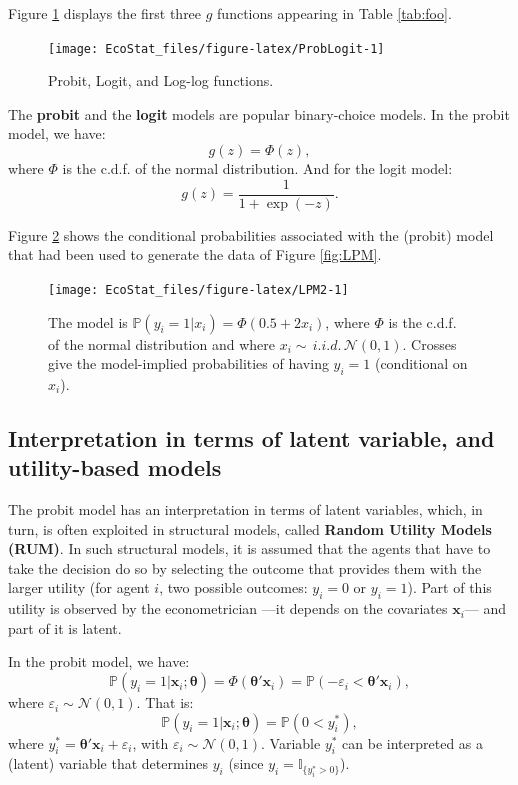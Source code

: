 \documentclass[
  12pt,
]{book}
\theoremstyle{definition}
\theoremstyle{definition}
\theoremstyle{definition}
\theoremstyle{definition}
\theoremstyle{remark}
\begin{document}
Figure \ref{fig:ProbLogit} displays the first three \(g\) functions appearing in Table \ref{tab:foo}.

\begin{figure}
\texttt{[image: EcoStat\_files/figure-latex/ProbLogit-1]} \caption{Probit, Logit, and Log-log functions.}\label{fig:ProbLogit}
\end{figure}

The \textbf{probit} and the \textbf{logit} models are popular binary-choice models. In the probit model, we have:
\begin{equation}
g(z) = \Phi(z),\label{eq:probit}
\end{equation}
where \(\Phi\) is the c.d.f. of the normal distribution. And for the logit model:
\begin{equation}
g(z) = \frac{1}{1+\exp(-z)}.\label{eq:logit}
\end{equation}

Figure \ref{fig:LPM2} shows the conditional probabilities associated with the (probit) model that had been used to generate the data of Figure \ref{fig:LPM}.

\begin{figure}
\texttt{[image: EcoStat\_files/figure-latex/LPM2-1]} \caption{The model is $\mathbb{P}(y_i=1|x_i)=\Phi(0.5+2x_i)$, where $\Phi$ is the c.d.f. of the normal distribution and where $x_i \sim \,i.i.d.\,\mathcal{N}(0,1)$. Crosses give the model-implied probabilities of having $y_i=1$ (conditional on $x_i$).}\label{fig:LPM2}
\end{figure}

\hypertarget{latent}{%
\subsection{Interpretation in terms of latent variable, and utility-based models}\label{latent}}

The probit model has an interpretation in terms of latent variables, which, in turn, is often exploited in structural models, called \textbf{Random Utility Models (RUM)}. In such structural models, it is assumed that the agents that have to take the decision do so by selecting the outcome that provides them with the larger utility (for agent \(i\), two possible outcomes: \(y_i=0\) or \(y_i=1\)). Part of this utility is observed by the econometrician ---it depends on the covariates \(\mathbf{x}_i\)--- and part of it is latent.

In the probit model, we have:
\[
\mathbb{P}(y_i=1|\mathbf{x}_i;\boldsymbol\theta) = \Phi(\boldsymbol\theta'\mathbf{x}_i) = \mathbb{P}(-\varepsilon_{i}<\boldsymbol\theta'\mathbf{x}_i),
\]
where \(\varepsilon_{i} \sim \mathcal{N}(0,1)\). That is:
\[
\mathbb{P}(y_i=1|\mathbf{x}_i;\boldsymbol\theta) = \mathbb{P}(0< y_i^*),
\]
where \(y_i^* = \boldsymbol\theta'\mathbf{x}_i + \varepsilon_i\), with \(\varepsilon_{i} \sim \mathcal{N}(0,1)\). Variable \(y_i^*\) can be interpreted as a (latent) variable that determines \(y_i\) (since \(y_i = \mathbb{I}_{\{y_i^*>0\}}\)).
\end{document}
